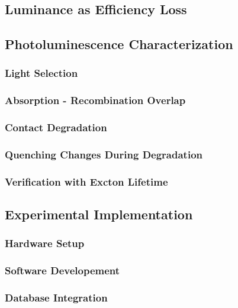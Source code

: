 \documentclass[../thesis.tex]{subfiles}
\begin{document}
\subsection{Luminance as Efficiency Loss}
\subsection{Photoluminescence Characterization}
\subsubsection{Light Selection}
\subsubsection{Absorption - Recombination Overlap}
\subsubsection{Contact Degradation}
\subsubsection{Quenching Changes During Degradation}
\subsubsection{Verification with Excton Lifetime}

\subsection{Experimental Implementation}
\subsubsection{Hardware Setup}
\subsubsection{Software Developement}
\subsubsection{Database Integration}
\end{document}
